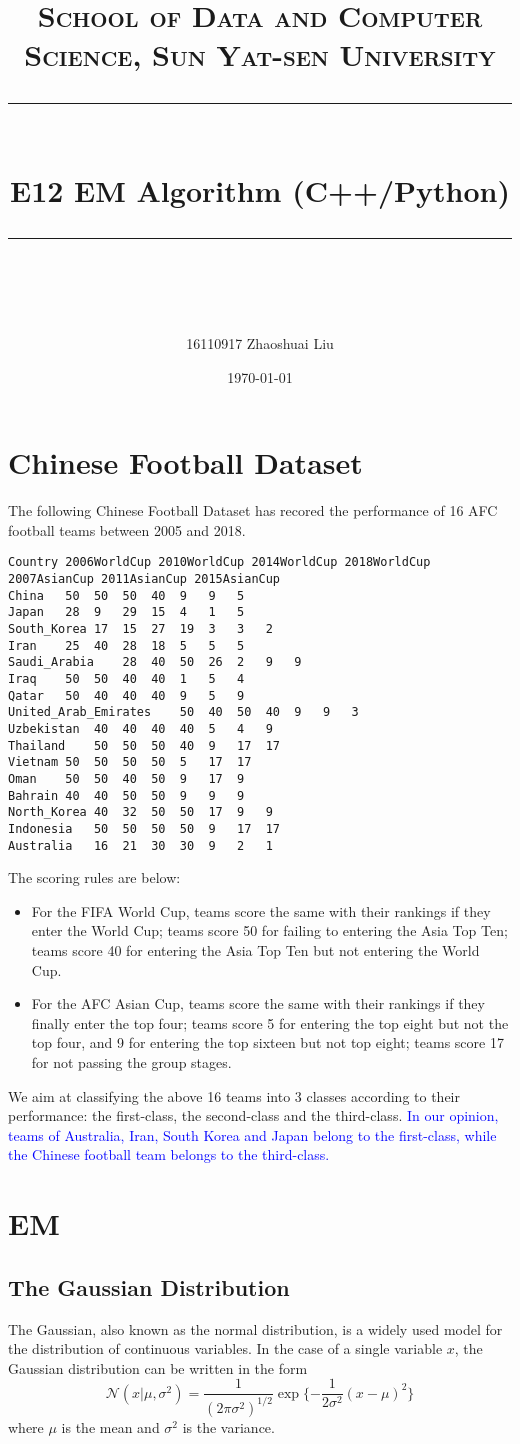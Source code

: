 ﻿\documentclass[a4paper, 11pt]{article}
\title{	
\normalfont \normalsize
\textsc{School of Data and Computer Science, Sun Yat-sen University} \\ [25pt] %
\rule{\textwidth}{0.5pt} \\[0.4cm] %
\huge  E12 EM Algorithm (C++/Python)\\ %
\rule{\textwidth}{2pt} \\[0.5cm] %
\author{16110917 Zhaoshuai Liu}
\date{\normalsize\today}
}
\numberwithin{equation}{subsection}
\begin{document}
\maketitle
\tableofcontents
\newpage
\section{Chinese Football Dataset}
The following Chinese Football Dataset has recored the performance of 16 AFC football teams between 2005 and 2018.
\begin{lstlisting}
Country	2006WorldCup 2010WorldCup 2014WorldCup 2018WorldCup 2007AsianCup 2011AsianCup 2015AsianCup
China	50	50	50	40	9	9	5
Japan	28	9	29	15	4	1	5
South_Korea	17	15	27	19	3	3	2
Iran	25	40	28	18	5	5	5
Saudi_Arabia	28	40	50	26	2	9	9
Iraq	50	50	40	40	1	5	4
Qatar	50	40	40	40	9	5	9
United_Arab_Emirates	50	40	50	40	9	9	3
Uzbekistan	40	40	40	40	5	4	9
Thailand	50	50	50	40	9	17	17
Vietnam	50	50	50	50	5	17	17
Oman	50	50	40	50	9	17	9
Bahrain	40	40	50	50	9	9	9
North_Korea	40	32	50	50	17	9	9
Indonesia	50	50	50	50	9	17	17
Australia	16	21	30	30	9	2	1
\end{lstlisting}

The scoring rules are below:
\begin{itemize}
	\item For the FIFA World Cup, teams score the same with their rankings if they enter the World Cup; teams score 50 for failing to entering the Asia Top Ten; teams score 40 for entering the Asia Top Ten but not entering the World Cup.
	\item For the AFC Asian Cup, teams score the same with their rankings if they finally enter the top four; teams score 5 for entering the top eight but not the top four, and 9 for entering the top sixteen but not top eight; teams score 17 for not passing the group stages.
\end{itemize}

We aim at classifying the above 16 teams into 3 classes according to their performance: the first-class, the second-class and the third-class. \textcolor{blue}{In our opinion, teams of Australia, Iran, South Korea and Japan belong to the first-class, while the Chinese football team belongs to the third-class.} 



\section{EM}
\subsection{The Gaussian Distribution}
The Gaussian, also known as the normal distribution, is a widely used model for the distribution of continuous variables. In the case of a single variable $x$, the Gaussian distribution can be written in the form
\begin{equation}
\mathcal N(x|\mu,\sigma^2)=\frac{1}{(2\pi\sigma^2)^{1/2}}\exp\{-\frac{1}{2\sigma^2}(x-\mu)^2\}
\end{equation}
where $\mu$ is the mean and $\sigma^2$ is the variance. 
\end{document}
